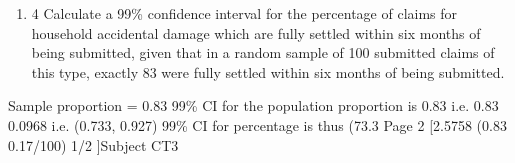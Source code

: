 \documentclass[a4paper,12pt]{article}
\begin{document}

\begin{enumerate}
\item 
4 Calculate a 99\% confidence interval for the percentage of claims for household accidental damage which are fully settled within six months of being submitted, given
that in a random sample of 100 submitted claims of this type, exactly 83 were fully settled within six months of being submitted.

\end{enumerate}

Sample proportion = 0.83
99\% CI for the population proportion is 0.83
i.e. 0.83 0.0968 i.e. (0.733, 0.927)
99\% CI for percentage is thus (73.3%
Page 2
[2.5758
(0.83 0.17/100) 1/2 ]Subject CT3 %
\end{document}
